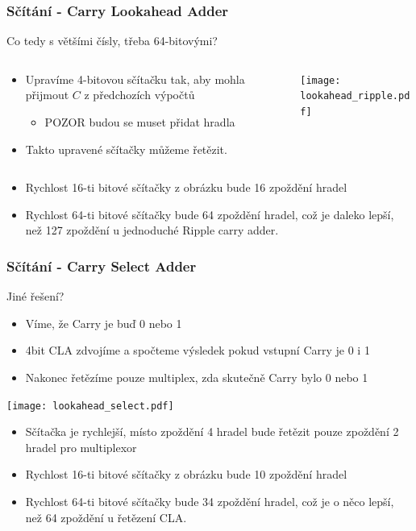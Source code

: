 \documentclass{beamer}
\begin{document}
\begin{frame}
\frametitle{Sčítání - Carry Lookahead Adder}

Co tedy s většími čísly, třeba 64-bitovými?

\begin{columns}
\begin{column}{0.45\textwidth}
\begin{itemize}
\item Upravíme 4-bitovou sčítačku tak, aby mohla přijmout $C$ z předchozích výpočtů
\begin{itemize}
\item POZOR budou se muset přidat hradla
\end{itemize}
\item Takto upravené sčítačky můžeme řetězit.
\end{itemize}
\end{column}
\begin{column}{0.55\textwidth}
\begin{center}
   \texttt{[image: lookahead\_ripple.pdf]}
\end{center}
\end{column}
\end{columns}


\begin{itemize}
\item Rychlost 16-ti bitové sčítačky z obrázku bude 16 zpoždění hradel
\item Rychlost 64-ti bitové sčítačky bude 64 zpoždění hradel, což je daleko lepší, než 127 zpoždění u jednoduché Ripple carry adder.
\end{itemize}

\end{frame}


\begin{frame}
\frametitle{Sčítání - Carry Select Adder}


Jiné řešení?

\begin{itemize}
\item Víme, že Carry je buď 0 nebo 1
\item 4bit CLA zdvojíme a spočteme výsledek pokud vstupní Carry je 0 i 1
\item Nakonec řetězíme pouze multiplex, zda skutečně Carry bylo 0 nebo 1
\end{itemize}
\begin{center}
   \texttt{[image: lookahead\_select.pdf]}
\end{center}

\begin{itemize}
\item Sčítačka je rychlejší, místo zpoždění 4 hradel bude řetězit pouze zpoždění 2 hradel pro multiplexor
\item Rychlost 16-ti bitové sčítačky z obrázku bude 10 zpoždění hradel
\item Rychlost 64-ti bitové sčítačky bude 34 zpoždění hradel, což je o něco lepší, než 64 zpoždění u řetězení CLA.
\end{itemize}

\end{frame}
\end{document}
